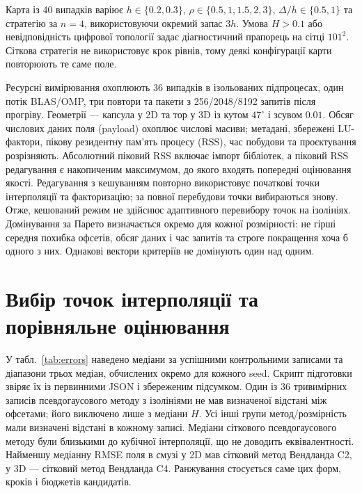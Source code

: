 \documentclass[12pt]{article}
\begin{document}
Карта із 40 випадків варіює $h\in\{0.2,0.3\}$, $\rho\in\{0.5,1,1.5,2,3\}$, $\Delta/h\in\{0.5,1\}$ та стратегію за $n=4$, використовуючи окремий запас $3h$. Умова $H>0.1$ або невідповідність цифрової топології задає діагностичний прапорець на сітці $101^2$. Сіткова стратегія не використовує крок рівнів, тому деякі конфігурації карти повторюють те саме поле.

Ресурсні вимірювання охоплюють 36 випадків в ізольованих підпроцесах, один потік BLAS/OMP, три повтори та пакети з 256/2048/8192 запитів після прогріву. Геометрії — капсула у 2D та тор у 3D із кутом $47^\circ$ і зсувом $0.01$. Обсяг числових даних поля (payload) охоплює числові масиви; метадані, збережені LU-фактори, пікову резидентну пам'ять процесу (RSS), час побудови та проєктування розрізняють. Абсолютний піковий RSS включає імпорт бібліотек, а піковий RSS редагування є накопиченим максимумом, до якого входять попередні оцінювання якості. Редагування з кешуванням повторно використовує початкові точки інтерполяції та факторизацію; за повної перебудови точки вибираються знову. Отже, кешований режим не здійснює адаптивного перевибору точок на ізолініях. Домінування за Парето визначається окремо для кожної розмірності: не гірші середня похибка офсетів, обсяг даних і час запитів та строге покращення хоча б одного з них. Однакові вектори критеріїв не домінують один над одним.

\section{Вибір точок інтерполяції та порівняльне оцінювання}
У табл.~\ref{tab:errors} наведено медіани за успішними контрольними записами та діапазони трьох медіан, обчислених окремо для кожного seed. Скрипт підготовки звіряє їх із первинними JSON і збереженим підсумком. Один із 36 тривимірних записів псевдогаусового методу з ізолініями не мав визначеної відстані між офсетами; його виключено лише з медіани $H$. Усі інші групи метод/розмірність мали визначені відстані в кожному записі. Медіани сіткового псевдогаусового методу були близькими до кубічної інтерполяції, що не доводить еквівалентності. Найменшу медіанну RMSE поля в смузі у 2D мав сітковий метод Вендланда C2, у 3D — сітковий метод Вендланда C4. Ранжування стосується саме цих форм, кроків і бюджетів кандидатів.
\begin{table}[htbp]\centering\resizebox{\linewidth}{!}{}\caption{Описові медіани на контрольних геометріях. Діапазони за seed не є довірчими інтервалами; $H$ — дискретна відстань між офсетами лише для визначених рівнів. Кількості невизначених відстаней збережено в записі походження даних.}\label{tab:errors}\end{table}
\end{document}
